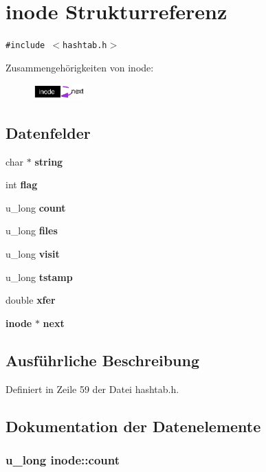 \section{inode Strukturreferenz}
\label{structinode}
{\tt \#include $<$hashtab.h$>$}

Zusammengeh\"{o}rigkeiten von inode:\begin{figure}[H]
\begin{center}
\leavevmode
\includegraphics[width=57pt]{structinode__coll__graph}
\end{center}
\end{figure}
\subsection*{Datenfelder}
\begin{CompactItemize}
\item 
char $\ast$ {\bf string}
\item 
int {\bf flag}
\item 
u\_\-long {\bf count}
\item 
u\_\-long {\bf files}
\item 
u\_\-long {\bf visit}
\item 
u\_\-long {\bf tstamp}
\item 
double {\bf xfer}
\item 
{\bf inode} $\ast$ {\bf next}
\end{CompactItemize}


\subsection{Ausf\"{u}hrliche Beschreibung}




Definiert in Zeile 59 der Datei hashtab.h.

\subsection{Dokumentation der Datenelemente}
\subsubsection{\setlength{\rightskip}{0pt plus 5cm}u\_\-long {\bf inode::count}}\label{structinode_8579979bc170cd8cceafabe3208cfb3c}





